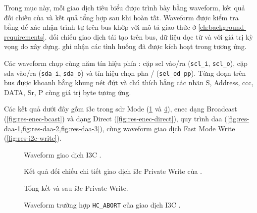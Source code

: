 Trong mục này, mỗi giao dịch tiêu biểu được trình bày bằng waveform, kết quả đối chiếu của
\Scoreboard{} và kết quả tổng hợp sau khi \VirtualSequence{} hoàn tất. Waveform được kiểm tra bằng
\SimVision{} để xác nhận trình tự trên bus khớp với mô tả giao thức ở
\cref{ch:background-requirements}. \Scoreboard{} đối chiếu giao dịch tái tạo trên bus, dữ liệu
đọc từ \RxFifo{} và \ResponseDescriptor{} với giá trị kỳ vọng do \ReferenceModel{} xây dựng.
\FunctionalCoverage{} ghi nhận các tình huống đã được kích hoạt trong \VirtualSequence{} tương ứng.

Các waveform chụp cùng năm tín hiệu phía \Controller{}: cặp \gls{scl} vào/ra
(\texttt{scl\_i}, \texttt{scl\_o}), cặp \gls{sda} vào/ra (\texttt{sda\_i}, \texttt{sda\_o}) và tín
hiệu chọn pha \OpenDrain{}/\PushPull{} (\texttt{sel\_od\_pp}). Từng đoạn trên bus được khoanh bằng
khung nét đứt và chú thích bằng các nhãn S, Address, \gls{ccc}, DATA, Sr, P cùng giá trị byte tương ứng.

Các kết quả dưới đây gồm \gls{i3c} \PrivateTransfer{} trong \gls{sdr} Mode
(\cref{fig:res-wave-write} và \cref{fig:res-wave-read}), \gls{enec} dạng Broadcast
(\cref{fig:res-enec-bcast}) và dạng Direct
(\cref{fig:res-enec-direct}), quy trình \gls{daa}
(\cref{fig:res-daa-1,fig:res-daa-2,fig:res-daa-3}), cùng waveform giao dịch
\LegacyIic{} Fast Mode Write (\cref{fig:res-i2c-write}).

\begin{figure}[!htbp]
	\centering
	
	\caption{Waveform giao dịch I3C \PrivateWrite{}.}
	\label{fig:res-wave-write}
\end{figure}
\begin{figure}[!htbp]
	\centering
	
	\caption{Kết quả đối chiếu chi tiết giao dịch \acrshort{i3c} Private Write của \Scoreboard{}.}
	\label{fig:res-log-i3c-write-transaction}
\end{figure}
\begin{figure}[!htbp]
	\centering
	
	\caption{Tổng kết \Scoreboard{} và \FunctionalCoverage{} sau \VirtualSequence{} \acrshort{i3c} Private Write.}
	\label{fig:res-log-i3c-write-scoreboard}
\end{figure}

\begin{figure}[!htbp]
	\centering
	
	\caption{Waveform trường hợp \texttt{HC\_ABORT} của giao dịch I3C \PrivateRead{}.}
	\label{fig:res-wave-read}
\end{figure}

